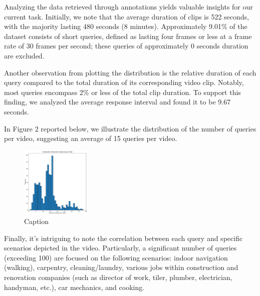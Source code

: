 \documentclass[conference]{IEEEtran}
\begin{document}
Analyzing the data retrieved through annotations yields valuable insights for our current task. Initially, we note that the average duration of clips is 522 seconds, with the majority lasting 480 seconds (8 minutes). Approximately 9.01\% of the dataset consists of short queries, defined as lasting four frames or less at a frame rate of 30 frames per second; these queries of approximately 0 seconds duration are excluded.

Another observation from plotting the distribution is the relative duration of each query compared to the total duration of its corresponding video clip. Notably, most queries encompass 2\% or less of the total clip duration. To support this finding, we analyzed the average response interval and found it to be 9.67 seconds.

In Figure 2 reported below, we illustrate the distribution of the number of queries per video, suggesting an average of 15 queries per video.

\begin{figure}[h]
\centering
\includegraphics[width=0.3\textwidth]{Figure2.pdf} %
\caption{Caption}
\label{fig:figure2}
\end{figure}

Finally, it's intriguing to note the correlation between each query and specific scenarios depicted in the video. Particularly, a significant number of queries (exceeding 100) are focused on the following scenarios: indoor navigation (walking), carpentry, cleaning/laundry, various jobs within construction and renovation companies (such as director of work, tiler, plumber, electrician, handyman, etc.), car mechanics, and cooking.
\end{document}
